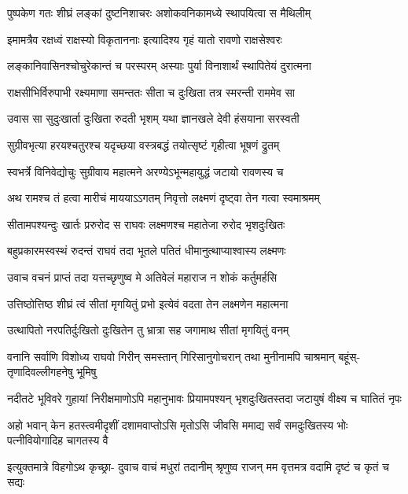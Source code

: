\twolineshloka
{पुष्पकेण गतः शीघ्रं लङ्कां दुष्टनिशाचरः}
{अशोकवनिकामध्ये स्थापयित्वा स मैथिलीम्} %

\twolineshloka
{इमामत्रैव रक्षध्वं राक्षस्यो विकृताननाः}
{इत्यादिश्य गृहं यातो रावणो राक्षसेश्वरः} %

\twolineshloka
{लङ्कानिवासिनश्चोचुरेकान्तं च परस्परम्}
{अस्याः पुर्या विनाशार्थं स्थापितेयं दुरात्मना} %

\twolineshloka
{राक्षसीभिर्विरुपाभी रक्ष्यमाणा समन्ततः}
{सीता च दुःखिता तत्र स्मरन्ती राममेव सा} %

\twolineshloka
{उवास सा सुदुःखार्ता दुःखिता रुदती भृशम्}
{यथा ज्ञानखले देवी हंसयाना सरस्वती} %

\twolineshloka
{सुग्रीवभृत्या हरयश्चतुरश्च यदृच्छया}
{वस्त्रबद्धं तयोत्सृष्टं गृहीत्वा भूषणं द्रुतम्} %

\twolineshloka
{स्वभर्त्रे विनिवेद्योचुः सुग्रीवाय महात्मने}
{अरण्येऽभून्महायुद्धं जटायो रावणस्य च} %

\twolineshloka
{अथ रामश्च तं हत्वा मारीचं माययाऽऽगतम्}
{निवृत्तो लक्ष्मणं दृष्ट्वा तेन गत्वा स्वमाश्रमम्} %

\twolineshloka
{सीतामपश्यन्दुः खार्तः प्ररुरोद स राघवः}
{लक्ष्मणश्च महातेजा रुरोद भृशदुःखितः} %

\twolineshloka
{बहुप्रकारमस्वस्थं रुदन्तं राघवं तदा}
{भूतले पतितं धीमानुत्थाप्याश्वास्य लक्ष्मणः} %

\twolineshloka
{उवाच वचनं प्राप्तं तदा यत्तच्छृणुष्व मे}
{अतिवेलं महाराज न शोकं कर्तुमर्हसि} %

\twolineshloka
{उत्तिष्ठोत्तिष्ठ शीघ्रं त्वं सीतां मृगयितुं प्रभो}
{इत्येवं वदता तेन लक्ष्मणेन महात्मना} %

\twolineshloka
{उत्थापितो नरपतिर्दुःखितो दुःखितेन तु}
{भ्रात्रा सह जगामाथ सीतां मृगयितुं वनम्} %

\fourlineindentedshloka
{वनानि सर्वाणि विशोध्य राघवो}
{गिरीन् समस्तान् गिरिसानुगोचरान्}
{तथा मुनीनामपि चाश्रमान् बहूंस्-}
{तृणादिवल्लीगहनेषु भूमिषु} %

\fourlineindentedshloka
{नदीतटे भूविवरे गुहायां}
{निरीक्षमाणोऽपि महानुभावः}
{प्रियामपश्यन् भृशदुःखितस्तदा}
{जटायुषं वीक्ष्य च घातितं नृपः} %

\fourlineindentedshloka
{अहो भवान् केन हतस्त्वमीदृशीं}
{दशामवाप्तोऽसि मृतोऽसि जीवसि}
{ममाद्य सर्वं समदुःखितस्य भोः}
{पत्नीवियोगादिह चागतस्य वै} %

\fourlineindentedshloka
{इत्युक्तमात्रे विहगोऽथ कृच्छ्रा-}
{दुवाच वाचं मधुरां तदानीम्}
{श्रृणुष्व राजन् मम वृत्तमत्र}
{वदामि दृष्टं च कृतं च सद्यः} %

